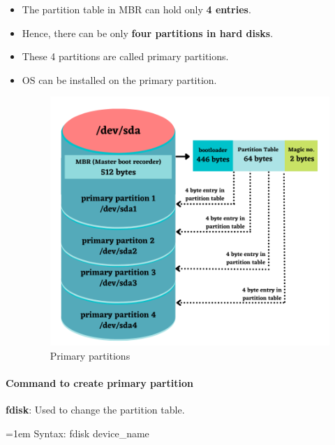 \setlength{\columnsep}{3pt}
\begin{flushleft}
	
	\begin{itemize}
		\item The partition table in MBR can hold only \textbf{4 entries}.
		\item Hence, there can be only \textbf{four partitions in hard disks}.
		\item These 4 partitions are called primary partitions.
		\item OS can be installed on the primary partition.
		\begin{figure}[h!]
			\centering
			\includegraphics[scale=.6]{content/chapter8/images/correction.png}
			\caption{Primary partitions}
			\label{primary_naming}
		\end{figure}		
		
	\end{itemize}

\newpage

\paragraph{Command to create primary partition}

\bigskip
\textbf{fdisk}: Used to change the partition table.
	\bigskip
	\begin{tcolorbox}[breakable,notitle,boxrule=-0pt,colback=pink,colframe=pink]
		\color{black}
		\font=1em
		Syntax: fdisk device\_name
		\font=4pt
	\end{tcolorbox}


\end{flushleft}

